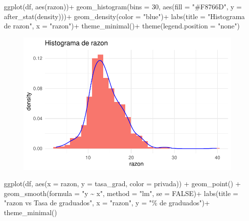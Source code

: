 \documentclass[
  letterpaper,
  DIV=11,
  numbers=noendperiod]{scrartcl}
\newenvironment{Shaded}{\begin{snugshade}}{\end{snugshade}}
\newcommand{\AttributeTok}[1]{\textcolor[rgb]{0.40,0.45,0.13}{#1}}
\newcommand{\ConstantTok}[1]{\textcolor[rgb]{0.56,0.35,0.01}{#1}}
\newcommand{\DecValTok}[1]{\textcolor[rgb]{0.68,0.00,0.00}{#1}}
\newcommand{\FunctionTok}[1]{\textcolor[rgb]{0.28,0.35,0.67}{#1}}
\newcommand{\NormalTok}[1]{\textcolor[rgb]{0.00,0.23,0.31}{#1}}
\newcommand{\SpecialCharTok}[1]{\textcolor[rgb]{0.37,0.37,0.37}{#1}}
\newcommand{\StringTok}[1]{\textcolor[rgb]{0.13,0.47,0.30}{#1}}
\begin{document}
\begin{Shaded}
\begin{Highlighting}[]
\FunctionTok{ggplot}\NormalTok{(df, }\FunctionTok{aes}\NormalTok{(razon))}\SpecialCharTok{+}
  \FunctionTok{geom\_histogram}\NormalTok{(}\AttributeTok{bins =} \DecValTok{30}\NormalTok{, }\FunctionTok{aes}\NormalTok{(}\AttributeTok{fill =} \StringTok{"\#F8766D"}\NormalTok{, }\AttributeTok{y =} \FunctionTok{after\_stat}\NormalTok{(density)))}\SpecialCharTok{+}
  \FunctionTok{geom\_density}\NormalTok{(}\AttributeTok{color =} \StringTok{"blue"}\NormalTok{)}\SpecialCharTok{+}
  \FunctionTok{labs}\NormalTok{(}\AttributeTok{title =} \StringTok{"Histograma de razon"}\NormalTok{,}
       \AttributeTok{x =} \StringTok{"razon"}\NormalTok{)}\SpecialCharTok{+}
  \FunctionTok{theme\_minimal}\NormalTok{()}\SpecialCharTok{+}
  \FunctionTok{theme}\NormalTok{(}\AttributeTok{legend.position =} \StringTok{"none"}\NormalTok{)}
\end{Highlighting}
\end{Shaded}

\begin{figure}[H]

{\centering \includegraphics{TP_final_files/figure-pdf/unnamed-chunk-19-1.pdf}

}

\end{figure}

\begin{Shaded}
\begin{Highlighting}[]
\FunctionTok{ggplot}\NormalTok{(df, }\FunctionTok{aes}\NormalTok{(}\AttributeTok{x =}\NormalTok{ razon, }\AttributeTok{y =}\NormalTok{ tasa\_grad, }\AttributeTok{color =}\NormalTok{ privada)) }\SpecialCharTok{+}
  \FunctionTok{geom\_point}\NormalTok{() }\SpecialCharTok{+} 
  \FunctionTok{geom\_smooth}\NormalTok{(}\AttributeTok{formula =} \StringTok{"y \textasciitilde{} x"}\NormalTok{, }\AttributeTok{method =} \StringTok{"lm"}\NormalTok{, }\AttributeTok{se =} \ConstantTok{FALSE}\NormalTok{)}\SpecialCharTok{+}
  \FunctionTok{labs}\NormalTok{(}\AttributeTok{title =} \StringTok{"razon vs Tasa de graduados"}\NormalTok{,}
       \AttributeTok{x =} \StringTok{"razon"}\NormalTok{,}
       \AttributeTok{y =} \StringTok{"\% de graduados"}\NormalTok{)}\SpecialCharTok{+}
  \FunctionTok{theme\_minimal}\NormalTok{()}
\end{Highlighting}
\end{Shaded}
\end{document}
